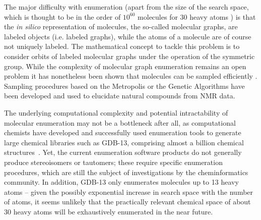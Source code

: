 \documentclass{sig-alternate}
\begin{document}
The major difficulty with enumeration (apart from the size of the
search space, which is thought to be in the order of $10^{60}$
molecules for 30 heavy atoms \cite{Bohacek:1996ve}) is that the
\emph{in silico} representation of molecules, the so-called molecular
graphs, are labeled objects (i.e. labeled graphs), while the atoms of
a molecule are of course not uniquely labeled. The mathematical
concept to tackle this problem is to consider orbits of labeled
molecular graphs under the operation of the symmetric group. While the
complexity of molecular graph enumeration remains an open problem it
has nonetheless been shown that molecules can be sampled
efficiently \cite{goldberg1999}. Sampling procedures based on the
Metropolis or the Genetic Algorithms have been developed and used to
elucidate natural compounds from NMR data.

The underlying computational complexity and potential intractability
of molecular enumeration may not be a bottleneck after all, as
computational chemists have developed and successfully used
enumeration tools to generate large chemical libraries such as GDB-13,
comprising almost a billion chemical structures~\cite{GDB}. Yet, the
current enumeration software products do not generally produce
stereoisomers or tautomers; these require specific enumeration
procedures, which are still the subject of investigations by the
cheminformatics community. In addition, GDB-13 only enumerates
molecules up to 13 heavy atoms -- given the possibly exponential
increase in search space with the number of atoms, it seems unlikely
that the practically relevant chemical space of about 30 heavy atoms
will be exhaustively enumerated in the near future.
\end{document}
